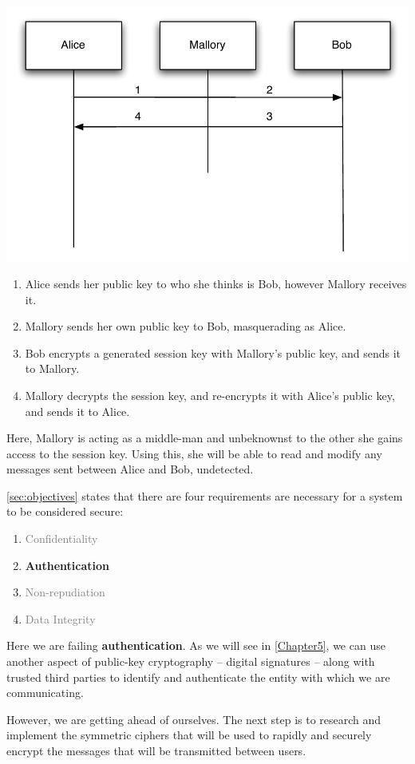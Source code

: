 \begin{center}
  \includegraphics[scale=0.6]{./Figures/3-7-1.pdf}
\end{center}

\begin{enumerate}
  \item Alice sends her public key to who she thinks is Bob, however Mallory receives it.
  \item Mallory sends her own public key to Bob, masquerading as Alice.
  \item Bob encrypts a generated session key with Mallory's public key, and sends it to Mallory.
  \item Mallory decrypts the session key, and re-encrypts it with Alice's public key, and sends it to Alice.
\end{enumerate}

Here, Mallory is acting as a middle-man and unbeknownst to the other she gains access to the session key. Using this, she will be able to read and modify any messages sent between Alice and Bob, undetected.

\textsection\ref{sec:objectives} states that there are four requirements are necessary for a system to be considered secure:

\begin{enumerate}
	\item \textcolor{gray}{Confidentiality}
	\item \textbf{Authentication}
	\item \textcolor{gray}{Non-repudiation}
	\item \textcolor{gray}{Data Integrity}
\end{enumerate}

Here we are failing \textbf{authentication}. As we will see in \textsection\ref{Chapter5}, we can use another aspect of public-key cryptography -- digital signatures -- along with trusted third parties to identify and authenticate the entity with which we are communicating.

However, we are getting ahead of ourselves. The next step is to research and implement the symmetric ciphers that will be used to rapidly and securely encrypt the messages that will be transmitted between users.
